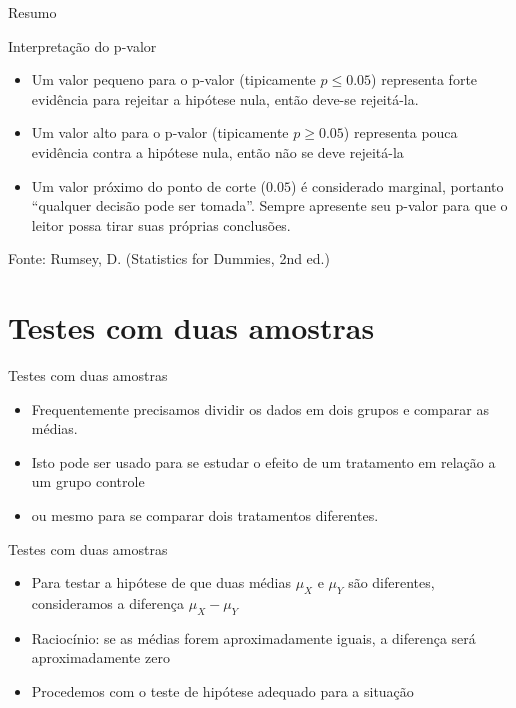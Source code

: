 \documentclass{beamer}
\begin{document}
\begin{frame}{Resumo}
\begin{block}{Interpretação do p-valor}
  \begin{itemize}
  \item Um valor pequeno para o p-valor (tipicamente $p \le 0.05$)
    representa forte evidência para rejeitar a hipótese nula, então
    deve-se rejeitá-la.
  \item Um valor alto para o p-valor (tipicamente $p \ge 0.05$)
    representa pouca evidência contra a hipótese nula, então não se
    deve rejeitá-la
  \item Um valor próximo do ponto de corte ($0.05$) é considerado
    marginal, portanto ``qualquer decisão pode ser tomada''. Sempre
    apresente seu p-valor para que o leitor possa tirar suas próprias
    conclusões.
  \end{itemize}
\end{block}
Fonte: Rumsey, D. (Statistics for Dummies, 2nd ed.)
\end{frame}

\section{Testes com duas amostras}

\begin{frame}{Testes com duas amostras}
  \begin{itemize}
  \item Frequentemente precisamos dividir os dados em dois grupos e
    comparar as médias.
  \item Isto pode ser usado para se estudar o efeito de um tratamento
    em relação a um grupo controle
  \item ou mesmo para se comparar dois tratamentos diferentes.    
  \end{itemize}
\end{frame}

\begin{frame}{Testes com duas amostras}
  \begin{itemize}
  \item Para testar a hipótese de que duas médias $\mu_X$ e $\mu_Y$
    são diferentes, consideramos a diferença $\mu_X - \mu_Y$
  \item Raciocínio: se as médias forem aproximadamente iguais, a
    diferença será aproximadamente zero
  \item Procedemos com o teste de hipótese adequado para a situação
  \end{itemize}
\end{frame}
\end{document}
